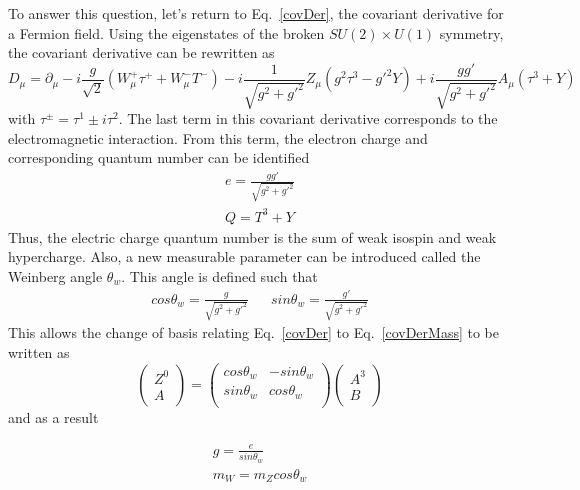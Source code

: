 To answer this question, let's return to Eq.~\ref{covDer}, the covariant derivative for a Fermion field. Using the eigenstates of the broken $SU(2) \times U(1)$ symmetry, the covariant derivative can be rewritten as
\begin{equation}
    D_{\mu}=\partial_{\mu}- i\frac{g}{\sqrt{2}}(W^{+}_{\mu}\tau^{+} + W^{-}_{\mu}T^{-}) - i \frac{1}{\sqrt{g^{2}+g'^{2}}}Z_{\mu}(g^{2}\tau^{3}-g'^{2}Y) + i\frac{gg'}{\sqrt{g^{2}+g'^{2} }}A_{\mu}(\tau^{3}+Y)
    \label{covDerMass}
\end{equation}
with $\tau^{\pm}=\tau^{1}\pm i\tau^{2}$. The last term in this covariant derivative corresponds to the electromagnetic interaction. From this term, the electron charge and corresponding quantum number can be identified
\begin{align}
    e = \frac{gg'}{\sqrt{g^{2}+g'^{2}}} \\
    Q = T^{3} + Y
\end{align}
Thus, the electric charge quantum number is the sum of weak isospin and weak hypercharge. Also, a new measurable parameter can be introduced called the Weinberg angle $\theta_{w}$. This angle is defined such that
\begin{align}
    cos \theta_{w} = \frac{g}{\sqrt{g^{2}+g'^{2}}} && sin \theta_{w} = \frac{g'}{\sqrt{g^{2} + g'^{2}}}
\end{align}
This allows the change of basis relating Eq.~\ref{covDer} to Eq.~\ref{covDerMass} to be written as
\begin{equation}
    \begin{pmatrix}
    Z^{0} \\
    A
    \end{pmatrix}
    =
    \begin{pmatrix}
    cos \theta_{w} & -sin \theta_{w} \\
    sin \theta_{w} & cos \theta_{w} \\
    \end{pmatrix}
    \begin{pmatrix}
    A^{3} \\
    B
    \end{pmatrix}
\end{equation}
and as a result

\begin{align}
    g = \frac{e}{sin \theta_{w}} \\
    m_{W}=m_{Z}cos \theta_{w}
\end{align}

